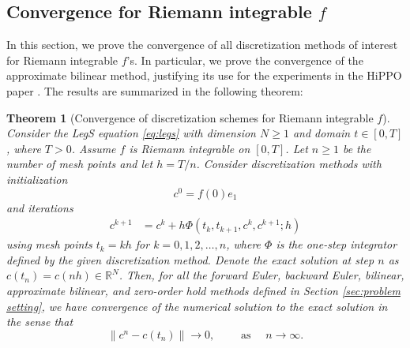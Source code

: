 \documentclass{article}
\newtheorem{theorem}{Theorem}
\theoremstyle{definition}
\begin{document}


\subsection{Convergence for Riemann integrable $f$} \label{subsec:riemann_f}

In this section, we prove the convergence of all discretization methods of interest for Riemann integrable $f$'s. 
In particular, we prove the convergence of the approximate bilinear method, justifying its use for the experiments in the HiPPO paper \citep{gu2020hippo}. 
The results are summarized in the following theorem:


\begin{theorem} [Convergence of discretization schemes for Riemann integrable $f$]
\label{thm:conv_riemann}
    Consider the LegS equation \eqref{eq:legs} with dimension $N\ge 1$ and domain $t \in [0,T]$, where $T>0$. 
    Assume $f$ is Riemann integrable on $[0,T]$.
    Let $n \ge 1$ be the number of mesh points and let $h=T/n$.
    Consider discretization methods with initialization
    \[
    c^0 = f(0) e_1
    \]
    and iterations
    \begin{align*}
    c^{k+1} &= c^k + h \Phi(t_k,t_{k+1},c^k,c^{k+1}; h) 
    \end{align*}
    using mesh points $t_k = kh$ for $k = 0, 1, 2, \dots, n$, where $\Phi$ is the one-step integrator defined by the given discretization method. Denote the exact solution at step $n$ as $c(t_n) = c(nh) \in \mathbb{R}^N$. Then, for all the forward Euler, backward Euler, bilinear, approximate bilinear, and zero-order hold methods defined in Section \ref{sec:problem setting}, we have convergence of the numerical solution to the exact solution in the sense that
\[
\|c^n-c(t_n)\|\rightarrow 0,\qquad\text{ as } \quad n \rightarrow \infty.
\]
\end{theorem}
\end{document}
